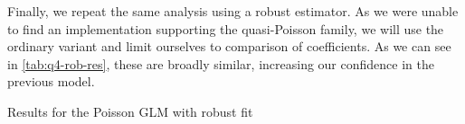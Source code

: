 \documentclass[titlepage]{article}
\begin{document}
Finally, we repeat the same analysis using a robust estimator. As we were unable to find an implementation supporting the quasi-Poisson family, we will use the ordinary variant and limit ourselves to comparison of coefficients. As we can see in \cref{tab:q4-rob-res}, these are broadly similar, increasing our confidence in the previous model.

\begin{table}[!htb]
  \centering
  
  \caption{Results for the Poisson GLM with robust fit}
  \label{tab:q4-rob-res}
\end{table}

\clearpage

\printbibliography%
\end{document}
